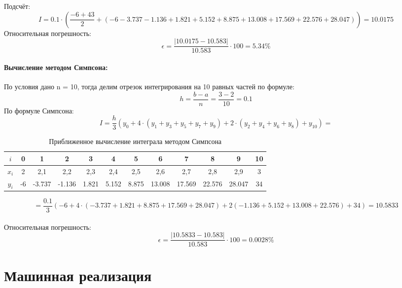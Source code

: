\documentclass{article}
\begin{document}
Подсчёт:
\[I = 0.1\cdot \left(\frac{-6+43}{2}+(-6-3.737-1.136+1.821+5.152+8.875+13.008+17.569+22.576 +28.047)\right) = 10.0175\]
Относительная погрешность:
\[\epsilon = \frac{|10.0175 - 10.583|}{10.583}\cdot 100 = 5.34\%\]
\\
\textbf{Вычисление методом Симпсона:}\\ \\
По условия дано n = 10, тогда делим отрезок интегрирования на 10 равных частей по формуле:
\[h=\frac{b-a}{n} = \frac{3-2}{10} = 0.1\]
По формуле Симпсона:
\[I = \frac{h}{3}(y_0+ 4\cdot(y_1 + y_3+ y_5+ y_7+ y_9)+2\cdot(y_2 + y_4+ y_6+ y_8) + y_{10}) = \] 
\begin{table}[H]
    \centering
    \begin{tabular}{|c|c|c|c|c|c|c|c|c|c|c|c|}
        \hline
        $i$ & 0 & 1 & 2 & 3 & 4 & 5 & 6& 7& 8& 9& 10\\
        \hline
        $x_i$ & 2 & 2,1 & 2,2& 2,3& 2,4& 2,5& 2,6& 2,7& 2,8& 2,9& 3\\
        \hline
        $y_i$ &-6& -3.737& -1.136& 1.821& 5.152& 8.875& 13.008& 17.569& 22.576& 28.047& 34 \\
        \hline
        \end{tabular}
        \caption{Приближенное вычисление интеграла методом Симпсона}
        \label{tab:midpoint_approximation}  
\end{table}

\[= \frac{0.1}{3}(-6+ 4\cdot(-3.737 + 1.821+ 8.875+ 17.569+ 28.047)+2(-1.136 + 5.152+ 13.008+ 22.576) + 34) = 10.5833\]\\
Относительная погрешность:
\[\epsilon = \frac{|10.5833 - 10.583|}{10.583}\cdot 100 = 0.0028\%\]
\section{Машинная реализация}
\end{document}
